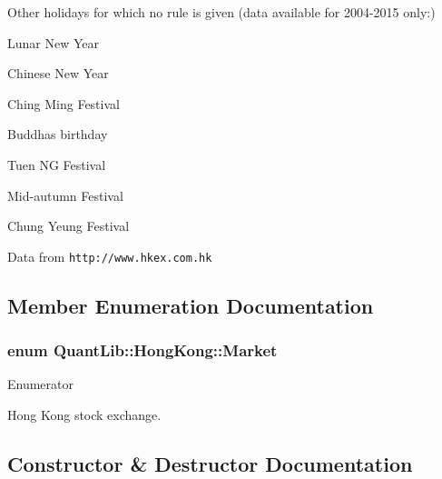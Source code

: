 Other holidays for which no rule is given (data available for 2004-\/2015 only\+:) 
\begin{DoxyItemize}
\item Lunar New Year 
\item Chinese New Year 
\item Ching Ming Festival 
\item Buddha\textquotesingle{}s birthday 
\item Tuen NG Festival 
\item Mid-\/autumn Festival 
\item Chung Yeung Festival 
\end{DoxyItemize}

Data from {\tt http\+://www.\+hkex.\+com.\+hk} 

\subsection{Member Enumeration Documentation}
\subsubsection[{Market}]{\setlength{\rightskip}{0pt plus 5cm}enum {\bf Quant\+Lib\+::\+Hong\+Kong\+::\+Market}}\label{class_quant_lib_1_1_hong_kong_a0db339a815e493f8c61c70c9990b0260}
\begin{Desc}
\item[Enumerator]\par
\begin{description}
\item[{\em 
H\+K\+Ex\label{class_quant_lib_1_1_hong_kong_a0db339a815e493f8c61c70c9990b0260a48dd37edca6b0618e5dee61142998dd1}
}]Hong Kong stock exchange. \end{description}
\end{Desc}


\subsection{Constructor \& Destructor Documentation}

